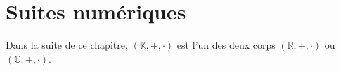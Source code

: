 \chapter{Suites numériques}
    Dans la suite de ce chapitre, \((\mathbb{K}, +, \cdot)\) est l'un des deux corps \((\mathbb{R}, +, \cdot)\) ou \((\mathbb{C}, +, \cdot)\).
    
    